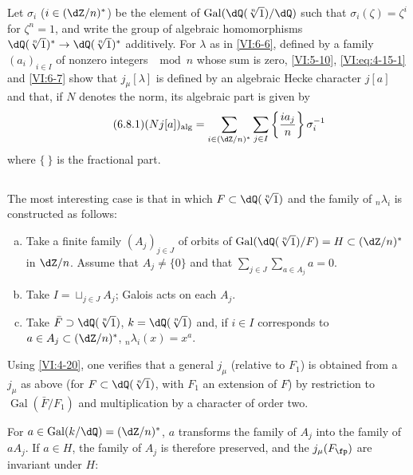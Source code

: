 \documentclass[oneside]{book}
\DeclareMathOperator{\gal}{Gal}
\newcounter{char}
\theoremstyle{sga-source}
\theoremstyle{sga-source-dash}
\theoremstyle{sga-source-dotdash}
\theoremstyle{sga-source-number-note-dash}
\theoremstyle{sga-source-note-number-dotdash}
\theoremstyle{sga-source-example-dotdash}
\theoremstyle{sga-source-inline-number}
\theoremstyle{sga-source-bare-number}
\theoremstyle{sga-source}
\newcommand{\PrintPage}[1]{}\newcommand{\MathPage}[1]{}\newcommand{\PrintCite}[2]{#1}\newcommand{\var}[3]{#1}
\begin{document}
Let $\sigma_i$ ($i\in (\dZ/n)^\ast$) be the element of 
$\gal(\dQ(\sqrt[n]{1})/\dQ)$ such that $\sigma_i(\zeta)=\zeta^i$ for $\zeta^n=1$, 
and write the group of algebraic homomorphisms 
$\dQ(\sqrt[n]{1})^\ast \to \dQ(\sqrt[n]{1})^\ast$ additively. For $\lambda$ as in 
\ref{VI:6-6}, defined by a family 
$(a_i)_{i\in I}$ of nonzero integers $\mod n$ whose sum is zero, 
\ref{VI:5-10}, \eqref{VI:eq:4-15-1} and \ref{VI:6-7} 
show that $j_\mu[\lambda]$ is defined by an algebraic Hecke character 
$j[a]$ and that, if $N$ denotes the norm, its algebraic part is 
given by 
\begin{equation*}\tag{6.8.1}\label{VI:eq:6-8-1}
  (N j[a])_\text{alg} = \sum_{i\in (\dZ/n)^\ast} \sum_{j\in I} \left\{ \frac{i a_j}{n} \right\} \sigma_i^{-1} 
\end{equation*}
  where $\{\ \}$ is the fractional part. 





\subsection{}\label{VI:6-9}

The most interesting case is that in which $F\subset \dQ(\sqrt[n]{1})$ and 
the family of $_n \lambda_i$ is constructed as follows: 
\begin{enumerate}[a)]
  \item Take a finite family $(A_j)_{j\in J}$ of orbits of 
    $\gal(\dQ(\sqrt[n]{1})/F)=H\subset (\dZ/n)^\ast$ in $\dZ/n$. Assume that 
    $A_j\ne\{0\}$ and that $\sum_{j\in J} \sum_{a\in A_j} a=0$. 
  \PrintPage{217}
\item Take $I=\sqcup_{j\in J} A_j$; Galois acts on each $A_j$. 
  \item Take $\bar F\supset \dQ(\sqrt[n]{1})$, $k=\dQ(\sqrt[n]{1})$ and, if 
    $i\in I$ corresponds to \var{$a\in A_j\subset (\dZ/n)^\ast$}{$a\in A_j\subset\dZ/n$}{S45-ASTRA-S-0037}, 
    $_n\lambda_i(x)=x^a$. 
\end{enumerate}

Using \ref{VI:4-20}, one verifies that a general $j_\mu$ (relative to 
$F_1$) is obtained from a $j_\mu$ as above (for 
$F\subset \dQ(\sqrt[n]{1})$, with $F_1$ an extension of $F$) by restriction to 
$\gal(\bar F/F_1)$ and multiplication by a character of order two. 

For $a\in \gal(k/\dQ)=(\dZ/n)^\ast$, $a$ transforms the family of $A_j$ 
into the family of $a A_j$. If $a\in H$, the family of $A_j$ is therefore preserved, 
and the $j_\mu(F_\fp)$ are invariant under $H$: 
\end{document}
